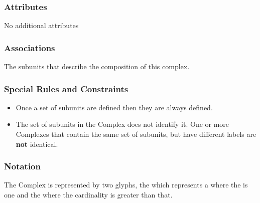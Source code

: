 \subsubsection{Attributes}

No additional attributes 

\subsubsection{Associations}

\begin{attributes}
   The subunits that describe
  the composition of this complex.
 \end{attributes}


\subsubsection{Special Rules and Constraints}

\begin{itemize}
\item Once a set of subunits are defined then they are always defined.
\item The set of subunits in the Complex does not identify it. One or
  more Complexes that contain the same set of subunits, but have
  different labels are \textbf{not} identical.
\end{itemize}


\subsubsection{Notation}

The Complex is represented by two glyphs, the 
which represents a  where the 
is one and the  where the cardinality is
greater than that.

